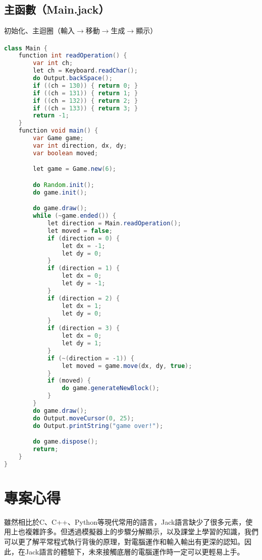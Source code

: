 \documentclass[pstricks, 12pt, a4paper]{article}
\newcommand{\then}[2][]{\xrightarrow[#1]{#2}}
\begin{document}
  \subsection{主函數（Main.jack）}
    初始化、主迴圈（輸入$\then{}$移動$\then{}$生成$\then{}$顯示）
    \begin{lstlisting}[language=Java, frame=single]
class Main {
    function int readOperation() {
        var int ch;
        let ch = Keyboard.readChar();
        do Output.backSpace();
        if ((ch = 130)) { return 0; }
        if ((ch = 131)) { return 1; }
        if ((ch = 132)) { return 2; }
        if ((ch = 133)) { return 3; }
        return -1;
    }
    function void main() {
        var Game game;
        var int direction, dx, dy;
        var boolean moved;

        let game = Game.new(6);

        do Random.init();
        do game.init();

        do game.draw();
        while (~game.ended()) {
            let direction = Main.readOperation();
            let moved = false;
            if (direction = 0) {
                let dx = -1;
                let dy = 0;
            }
            if (direction = 1) {
                let dx = 0;
                let dy = -1;
            }
            if (direction = 2) {
                let dx = 1;
                let dy = 0;
            }
            if (direction = 3) {
                let dx = 0;
                let dy = 1;
            }
            if (~(direction = -1)) {
                let moved = game.move(dx, dy, true);
            }
            if (moved) {
                do game.generateNewBlock();
            }
        }
        do game.draw();
        do Output.moveCursor(0, 25);
        do Output.printString("game over!");

        do game.dispose();
        return;
    }
}
    \end{lstlisting}

\section{專案心得}
雖然相比於C、C++、Python等現代常用的語言，Jack語言缺少了很多元素，使用上也複雜許多。但透過模擬器上的步驟分解顯示，以及課堂上學習的知識，我們可以更了解平常程式執行背後的原理，對電腦運作和輸入輸出有更深的認知。因此，在Jack語言的體驗下，未來接觸底層的電腦運作時一定可以更輕易上手。
\end{document}
